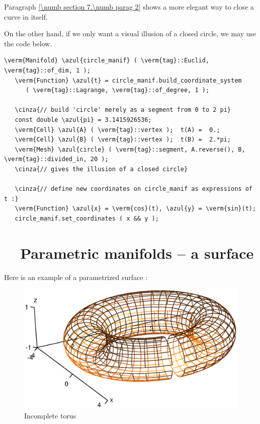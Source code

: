 Paragraph \ref{\numb section 7.\numb parag 2} shows a more elegant way to close a curve in itself.

On the other hand, if we only want a visual illusion of a closed circle, we may use the code below.

\begin{Verbatim}[commandchars=\\\{\},formatcom=\small\tt,baselinestretch=0.94]
   \verm{Manifold} \azul{circle_manif} ( \verm{tag}::Euclid, \verm{tag}::of_dim, 1 );
   \verm{Function} \azul{t} = circle_manif.build_coordinate_system
      ( \verm{tag}::Lagrange, \verm{tag}::of_degree, 1 );

   \cinza{// build 'circle' merely as a segment from 0 to 2 pi}
   const double \azul{pi} = 3.1415926536;
   \verm{Cell} \azul{A} ( \verm{tag}::vertex );  t(A) =  0.;
   \verm{Cell} \azul{B} ( \verm{tag}::vertex );  t(B) =  2.*pi;
   \verm{Mesh} \azul{circle} ( \verm{tag}::segment, A.reverse(), B, \verm{tag}::divided_in, 20 );
   \cinza{// gives the illusion of a closed circle}

   \cinza{// define new coordinates on circle_manif as expressions of t :}
   \verm{Function} \azul{x} = \verm{cos}(t), \azul{y} = \verm{sin}(t);
   circle_manif.set_coordinates ( x && y );
\end{Verbatim}


\section{~~Parametric manifolds -- a surface}\label{\numb section 2.\numb parag 16}

Here is an example of a parametrized surface :

\begin{figure}[ht] \centering
  \includegraphics[width=125mm]{torus}
  \caption{Incomplete torus}
\end{figure}

